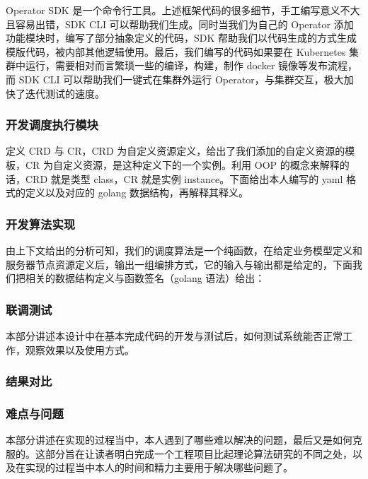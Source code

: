 Operator SDK 是一个命令行工具。上述框架代码的很多细节，手工编写意义不大且容易出错，SDK CLI 可以帮助我们生成。同时当我们为自己的 Operator 添加功能模块时，编写了部分抽象定义的代码，SDK 帮助我们以代码生成的方式生成模版代码，被内部其他逻辑使用。最后，我们编写的代码如果要在 Kubernetes 集群中运行，需要相对而言繁琐一些的编译，构建，制作 docker 镜像等发布流程，而 SDK CLI 可以帮助我们一键式在集群外运行 Operator，与集群交互，极大加快了迭代测试的速度。

\subsubsection{开发调度执行模块}

定义 CRD 与 CR，CRD 为自定义资源定义，给出了我们添加的自定义资源的模板，CR 为自定义资源，是这种定义下的一个实例。利用 OOP 的概念来解释的话，CRD 就是类型 class，CR 就是实例 instance。下面给出本人编写的 yaml 格式的定义以及对应的 golang 数据结构，再解释其释义。


\subsubsection{开发算法实现}

由上下文给出的分析可知，我们的调度算法是一个纯函数，在给定业务模型定义和服务器节点资源定义后，输出一组编排方式，它的输入与输出都是给定的，下面我们把相关的数据结构定义与函数签名（golang 语法）给出：


\subsubsection{联调测试}

本部分讲述本设计中在基本完成代码的开发与测试后，如何测试系统能否正常工作，观察效果以及使用方式。



\subsubsection{结果对比}

\subsubsection{难点与问题}

本部分讲述在实现的过程当中，本人遇到了哪些难以解决的问题，最后又是如何克服的。这部分旨在让读者明白完成一个工程项目比起理论算法研究的不同之处，以及在实现的过程当中本人的时间和精力主要用于解决哪些问题了。

